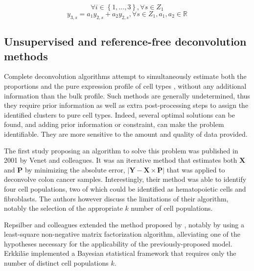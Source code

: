 \[
\forall i \in \left\{ 1, \ldots, 3 \right\}, \forall s \in Z_1
\] \[
y_{3, s} = a_1 y_{2, s} + a_2 y_{2, s}, \forall s \in Z_1, a_1, a_2 \in \mathbb{R}
\]


\subsection{Unsupervised and reference-free deconvolution methods}
\label{unsupervised-and-reference-free-deconvolution-methods}

Complete deconvolution algorithms attempt to simultaneously estimate
both the proportions and the pure expression profile of cell types
\autocite{shen-orr_gaujoux13},
without any additional information than the bulk profile. Such methods
are generally undetermined, thus they require prior information as well
as extra post-processing steps to assign the identified clusters to pure
cell types. Indeed, several optimal solutions can be found, and adding
prior information or constraint, can make the problem identifiable. They
are more sensitive to the amount and quality of data provided.

The first study proposing an algorithm to solve this problem was
published in 2001 by Venet and
colleagues\autocite{venet_etal01}. It
was an iterative method that estimates both \(\boldsymbol{X}\) and
\(\mathbf{P}\) by minimizing the absolute error,
\(|\mathbf{Y} - \boldsymbol{X} \times \mathbf{P}|\) that was applied to
deconvolve colon cancer samples. Interestingly, their method was able to
identify four cell populations, two of which could be identified as
hematopoietic cells and
fibroblasts\autocite{venet_etal01}.
The authors however discuss the limitations of their algorithm, notably
the selection of the appropriate \(k\) number of cell populations.

Repsilber and colleagues extended the method proposed by
\autocite{venet_etal01}, notably by
using a least-square non-negative matrix factorization algorithm,
alleviating one of the hypotheses necessary for the applicability of the
previously-proposed
model\autocite{repsilber_etal10}.
Erkkiläe implemented a Bayesian statistical framework that requires only
the number of distinct cell populations
\(k\)\autocite{erkkila_etal10}.

